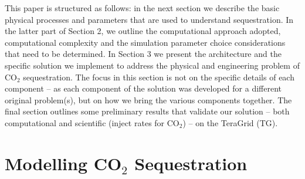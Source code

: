 \documentclass{acm_proc_article-sp}
\newcommand{\jhanote}[1]{ {\textcolor{red} { ***Jha: #1 }}}
\newcommand{\yyenote}[1]{ {\textcolor{blue} { ***yye00: #1 }}}
\newcommand{\jhanote}[1]{}
\newcommand{\yyenote}[1]{}
\begin{document}
This paper is structured as follows: in the next section we describe the basic
physical processes and parameters that are used to understand
sequestration. In the latter part of Section 2, we outline the
computational approach adopted, computational complexity and the
simulation parameter choice considerations that need to be determined.
In Section 3 we present the architecture and the specific solution we
implement to address the physical and engineering problem of CO$_2$
sequestration. The focus in this section is not on the specific
details of each component -- as each component of the solution was
developed for a different original problem(s), but on how we bring the
various components together.  The final section outlines some
preliminary results that validate our solution -- both computational
and scientific (inject rates for CO$_2$) -- on the TeraGrid (TG).



\section{Modelling CO$_2$ Sequestration}

\vspace{0.1in}


\end{document}
